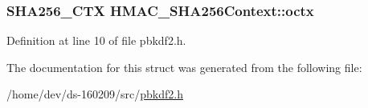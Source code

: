 \subsubsection[{octx}]{\setlength{\rightskip}{0pt plus 5cm}S\+H\+A256\+\_\+\+C\+T\+X H\+M\+A\+C\+\_\+\+S\+H\+A256\+Context\+::octx}\label{struct_h_m_a_c___s_h_a256_context_a699abe00837406f312a95226741137f4}


Definition at line 10 of file pbkdf2.\+h.



The documentation for this struct was generated from the following file\+:\begin{DoxyCompactItemize}
\item 
/home/dev/ds-\/160209/src/\hyperlink{pbkdf2_8h}{pbkdf2.\+h}\end{DoxyCompactItemize}
